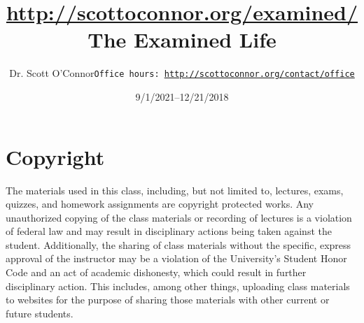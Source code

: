 \documentclass[article,oneside]{memoir}
\def\myauthor{Author}
\def\mytitle{Title}
\def\mycopyright{\myauthor}
\def\myweb{\href{http://scottoconnor.org/examined/}{http://scottoconnor.org/examined/}}
\def\myauthor{Dr. Scott O'Connor}
\def\mytitle{{\normalsize \myweb \newline} \HUGE The Examined Life}
\begin{document}
\setsansfont[Mapping=tex-text]{Myriad Pro} 
\setmonofont[Mapping=tex-text,Scale=0.8]{Georgia} 

\def\ind{\hangindent=1 true cm\hangafter=1 \noindent}
\def\labelitemi{$\cdot$}


\title{\LARGE \mytitle}     
\author{\Large\myauthor \newline \footnotesize\texttt{\noindent Office hours: \href{http://scottoconnor.org/contact/office}{http://scottoconnor.org/contact/office}}}
\date{9/1/2021--12/21/2018}


\maketitle




%
%

\section{Copyright}
The materials used in this class, including, but not limited to, lectures, exams, quizzes, and homework assignments are copyright protected works.  Any unauthorized copying of the class materials or recording of lectures is a violation of federal law and may result in disciplinary actions being taken against the student.  Additionally, the sharing of class materials without the specific, express approval of the instructor may be a violation of the University's Student Honor Code and an act of academic dishonesty, which could result in further disciplinary action.  This includes, among other things, uploading class materials to websites for the purpose of sharing those materials with other current or future students. 
\end{document}
